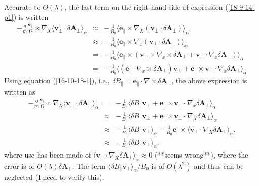 \documentclass{article}
\begin{document}
Accurate to $O (\lambda)$, the last term on the right-hand side of expression
(\ref{18-9-14-p1}) is written
\begin{eqnarray*}
  - \frac{q}{m}  \frac{\mathbf{e}_{\parallel}}{\Omega} \times \nabla_X \langle
  \mathbf{v}_{\perp} \cdot \delta \mathbf{A}_{\perp} \rangle_{\alpha} &
  \approx & - \frac{1}{B_0} \langle \mathbf{e}_{\parallel} \times \nabla_X
  (\mathbf{v}_{\perp} \cdot \delta \mathbf{A}_{\perp}) \rangle_{\alpha}\\
  & \approx & - \frac{1}{B_0} \langle \mathbf{e}_{\parallel} \times \nabla_x
  (\mathbf{v}_{\perp} \cdot \delta \mathbf{A}_{\perp}) \rangle_{\alpha}\\
  & = & - \frac{1}{B_0} \langle \mathbf{e}_{\parallel} \times
  (\mathbf{v}_{\perp} \times \nabla_x \times \delta \mathbf{A}_{\perp}
  +\mathbf{v}_{\perp} \cdot \nabla_x \delta \mathbf{A}_{\perp})
  \rangle_{\alpha}\\
  & = & - \frac{1}{B_0} \langle (\mathbf{e}_{\parallel} \cdot \nabla_x \times
  \delta \mathbf{A}_{\perp}) \mathbf{v}_{\perp} +\mathbf{e}_{\parallel} \times
  \mathbf{v}_{\perp} \cdot \nabla_x \delta \mathbf{A}_{\perp} \rangle_{\alpha}
\end{eqnarray*}
Using equation (\ref{16-10-18-1}), i.e., $\delta B_{\parallel}
=\mathbf{e}_{\parallel} \cdot \nabla \times \delta \mathbf{A}_{\perp}$, the
above expression is written as
\begin{eqnarray}
  - \frac{q}{m}  \frac{\mathbf{e}_{\parallel}}{\Omega} \times \nabla_X \langle
  \mathbf{v}_{\perp} \cdot \delta \mathbf{A}_{\perp} \rangle_{\alpha} & = & -
  \frac{1}{B_0} \langle \delta B_{\parallel} \mathbf{v}_{\perp}
  +\mathbf{e}_{\parallel} \times \mathbf{v}_{\perp} \cdot \nabla_x \delta
  \mathbf{A}_{\perp} \rangle_{\alpha} \nonumber\\
  & \approx & - \frac{1}{B_0} \langle \delta B_{\parallel} \mathbf{v}_{\perp}
  +\mathbf{e}_{\parallel} \times \mathbf{v}_{\perp} \cdot \nabla_X \delta
  \mathbf{A}_{\perp} \rangle_{\alpha} \nonumber\\
  & \approx & - \frac{1}{B_0} \langle \delta B_{\parallel} \mathbf{v}_{\perp}
  \rangle_{\alpha} - \frac{1}{B_0} \mathbf{e}_{\parallel} \times \langle
  \mathbf{v}_{\perp} \cdot \nabla_X \delta \mathbf{A}_{\perp} \rangle_{\alpha}
  . \nonumber\\
  & \approx & - \frac{1}{B_0} \langle \delta B_{\parallel} \mathbf{v}_{\perp}
  \rangle_{\alpha} .  \label{16-10-18-p5}
\end{eqnarray}
where use has been made of $\langle \mathbf{v}_{\perp} \cdot \nabla_X \delta
\mathbf{A}_{\perp} \rangle_{\alpha} \approx 0$ (**seems wrong**), where the
error is of $O (\lambda) \delta \mathbf{A}_{\perp}$. The term $\langle \delta
B_{\parallel} \mathbf{v}_{\perp} \rangle_{\alpha} / B_0$ is of $O (\lambda^2)$
and thus can be neglected (I need to verify this).
\end{document}
